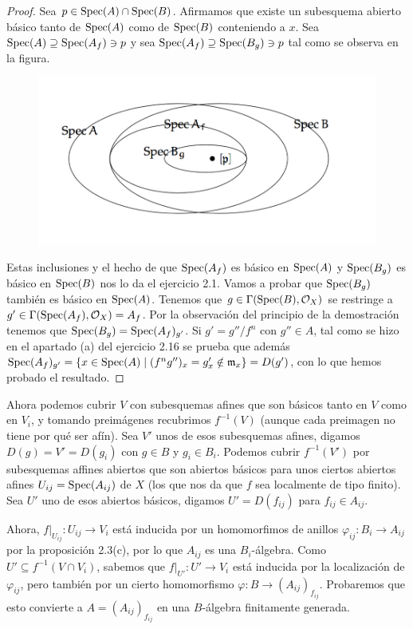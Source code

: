 \documentclass[twoside]{article}
\begin{document}
\begin{solucion}
\begin{proof}
Sea $p\in\operatorname{Spec}(A)\cap\operatorname{Spec}(B)$. Afirmamos que existe un subesquema abierto básico tanto de $\operatorname{Spec}(A)$ como de $\operatorname{Spec}(B)$ conteniendo a $x$. Sea $\operatorname{Spec}(A)\supseteq\operatorname{Spec}(A_f)\ni p$ y sea $\operatorname{Spec}(A_f)\supseteq\operatorname{Spec}(B_g)\ni p$ tal como se observa en la figura.
\begin{figure}[h!]
\centering
\includegraphics[scale=0.22]{3-1}
\end{figure}

 Estas inclusiones y el hecho de que $\operatorname{Spec}(A_f)$ es básico en $\operatorname{Spec}(A)$ y $\operatorname{Spec}(B_g)$ es básico en $\operatorname{Spec}(B)$ nos lo da el ejercicio 2.1. Vamos a probar que $\operatorname{Spec}(B_g)$ también es básico en $\operatorname{Spec}(A)$. Tenemos que $g\in\Gamma(\operatorname{Spec}(B),{\mathcal O}_X)$ se restringe a $g'\in\Gamma(\operatorname{Spec}(A_f),{\mathcal O}_X)=A_f$. Por la observación del principio de la demostración tenemos que $\operatorname{Spec}(B_g)=\operatorname{Spec}(A_f)_{g'}$. Si $g'=g''/f^n$ con $g''\in A$, tal como se hizo en el apartado (a) del ejercicio 2.16 se prueba que además $\operatorname{Spec}(A_f)_{g'}=\{x\in\operatorname{Spec}(A)\mid (f^ng'')_x=g'_x\notin \mathfrak{m}_x\}=D(g')$, con lo que hemos probado el resultado. 



\end{proof}
Ahora podemos cubrir $V$ con subesquemas afines que son básicos tanto en $V$ como en $V_i$, y tomando preimágenes recubrimos $f^{-1}(V)$ (aunque cada preimagen no tiene por qué ser afín). Sea $V'$ unos de esos subesquemas afines, digamos $D(g)=V'= D(g_i)$ con $g\in B$ y $g_i\in B_i$. Podemos cubrir $f^{-1}(V')$ por subesquemas affines abiertos que son abiertos básicos para unos ciertos abiertos afines $U_{ij}=\operatorname{Spec}(A_{ij})$ de $X$ (los que nos da que $f$ sea localmente de tipo finito). Sea $U'$ uno de esos abiertos básicos, digamos $U'=D(f_{ij})$ para $f_{ij}\in A_{ij}$. 

Ahora, $f|_{U_{ij}}:U_{ij}\to V_i$ está inducida por un homomorfimos de anillos $\varphi_{ij}:B_i\to A_{ij}$ por la proposición 2.3(c), por lo que $A_{ij}$ es una $B_i$-álgebra. Como $U'\subseteq f^{-1}(V\cap V_i)$, sabemos que $f|_{U'}:U'\to V_i$ está inducida por la localización de $\varphi_{ij}$, pero también por un cierto homomorfismo $\varphi:B\to (A_{ij})_{f_{ij}}$. Probaremos que esto convierte a $A=(A_{ij})_{f_{ij}}$ en una $B$-álgebra finitamente generada.


\end{solucion}
\end{document}

